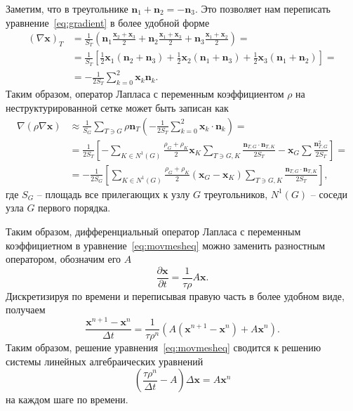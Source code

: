 Заметим, что в треугольнике $\mathbf{n}_1+\mathbf{n}_2 = -\mathbf{n}_3$. Это позволяет нам переписать уравнение~\eqref{eq:gradient} в более удобной форме
\begin{equation}
\begin{split}
(\nabla \mathbf{x})_T &= \frac{1}{S_T}\left( \mathbf{n}_1 \frac{\mathbf{x}_2+\mathbf{x}_3}{2} + \mathbf{n}_2 \frac{\mathbf{x}_1+\mathbf{x}_3}{2} +\mathbf{n}_3 \frac{\mathbf{x}_1+\mathbf{x}_2}{2} \right)=\\
&= \frac{1}{S_T}\left[\frac{1}{2}\mathbf{x}_1(\mathbf{n}_2+\mathbf{n}_3) + \frac{1}{2}\mathbf{x}_2(\mathbf{n}_1+\mathbf{n}_3) + \frac{1}{2}\mathbf{x}_3(\mathbf{n}_1+\mathbf{n}_2) \right]=\\
&=-\frac{1}{2S_T}\sum_{k=0}^{2}\mathbf{x}_k\mathbf{n}_k.
\end{split}
\end{equation}
Таким образом, оператор Лапласа с переменным коэффициентом $\rho$ на неструктурированной сетке может быть записан как
\begin{equation}
\begin{split}
\nabla(\rho \nabla \mathbf{x})
&\approx \frac{1}{S_G}\sum_{T\ni G}\rho \mathbf{n}_T \left(-\frac{1}{2S_T}\sum_{k=0}^{2}\mathbf{x}_k\cdot\mathbf{n}_k\right) =\\
&= \frac{1}{2S_T}\left[-\sum_{K\in N^1(G)}\frac{\rho_G + \rho_K}{2}\mathbf{x}_K \sum_{T\ni G,K}\frac{\mathbf{n}_{T,G} \cdot \mathbf{n}_{T,K}}{2S_T} - \mathbf{x}_G \sum \frac{\mathbf{n}_{T,G}^2}{2S_T}\right] =\\
&=-\frac{1}{2S_G}\left[ \sum_{K\in N^1(G)} \frac{\rho_G + \rho_K}{2} (\mathbf{x}_G - \mathbf{x}_K) \sum_{T\ni G,K}\frac{\mathbf{n}_{T,G} \cdot \mathbf{n}_{T,K}}{2S_T} \right],
\end{split}
\end{equation}
где $S_G$ -- площадь все прилегающих к узлу  $G$ треугольников, $N^1(G)$ -- соседи узла $G$ первого порядка.

Таким образом, дифференциальный оператор Лапласа с переменным коэффициетном в уравнение~\eqref{eq:movmesheq} можно заменить разностным оператором, обозначим его $A$
\begin{equation}
\frac{\partial \mathbf{x}}{\partial t} = \frac{1}{\tau \rho}A\mathbf{x}.
\end{equation}
Дискретизируя по времени и переписывая правую часть в более удобном виде, получаем
\begin{equation}
\frac{\mathbf{x}^{n+1} - \mathbf{x}^{n}}{\Delta t} = \frac{1}{\tau \rho^n}(A(\mathbf{x}^{n+1} -\mathbf{x}^n ) + A\mathbf{x}^{n}).
\end{equation}
Таким образом, решение уравнения~\eqref{eq:movmesheq} сводится к решению системы линейных алгебраических уравнений
\begin{equation}\label{eq:numerical}
\left(\frac{ \tau \rho^n}{\Delta t } - A\right) \Delta \mathbf{x} =  A\mathbf{x}^{n}
\end{equation}
на каждом шаге по времени.

